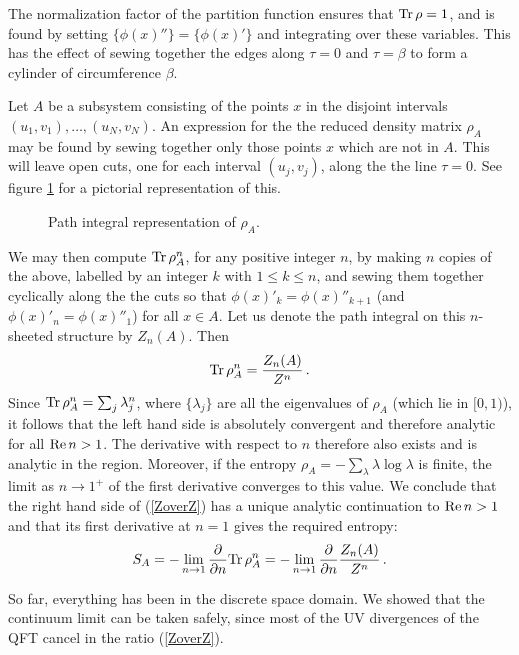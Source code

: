 \documentclass{ws-ijqi}
\begin{document}
The normalization factor of the partition function ensures that
${\rm Tr}\,\rho=1$, and is found by 
setting $\{\phi(x)''\}=\{\phi(x)'\}$ and integrating
over these variables. This has the effect of sewing together the edges
along $\tau=0$ and $\tau=\beta$ to form a cylinder of circumference
$\beta$. 


Let $A$ be a subsystem consisting of the points $x$ in the
disjoint intervals $(u_1,v_1),\ldots,(u_N,v_N)$. An expression for the
the reduced density matrix $\rho_A$
may be found %
by sewing together only those points $x$ which are not in $A$. This
will leave open cuts, one for each interval
$(u_j,v_j)$, along the the line $\tau=0$. See figure \ref{cil} for a 
pictorial representation of this.

\begin{figure}[b]
\caption{Path integral representation of $\rho_A$.}
\vspace{2mm}
\centerline{}
\label{cil}
\end{figure}

We may then compute ${\rm Tr}\,\rho_A^n$, for any positive
integer $n$, by making $n$ copies of the above, labelled by an integer
$k$ with $1\leq k\leq n$, and sewing them together cyclically along the 
the cuts so that $\phi(x)'_k=\phi(x)''_{k+1}$ (and
$\phi(x)'_n=\phi(x)''_1$) for all $x\in A$. Let us denote the
path integral on this $n$-sheeted structure by $Z_n(A)$.
Then
\begin{equation}
\label{ZoverZ}
{\rm Tr}\,\rho_A^n={Z_n(A)\over Z^n}\,.
\end{equation}
Since ${\rm Tr}\,\rho_A^n=\sum_j\lambda_j^n$,
where $\{\lambda_j\}$ are all the eigenvalues of $\rho_A$ (which lie in 
$[0,1)$), it follows that the left hand side is absolutely convergent and 
therefore analytic for all ${\rm Re}\,n>1$. 
The derivative with respect to $n$ therefore also
exists and is analytic in the region. Moreover, if the entropy
$\rho_A=-\sum_\lambda\lambda\log\lambda$ is finite, the limit as
$n\to1^+$ of the first derivative converges to this value. 
We conclude that the right hand side of (\ref{ZoverZ}) has a unique
analytic continuation to ${\rm Re}\,n>1$ and that its first derivative
at $n=1$ gives the required entropy:
\begin{equation}
S_A= -\lim_{n\to1}{\partial\over\partial n} {\rm Tr}\,\rho_A^n=
-\lim_{n\to1}{\partial\over\partial n}{Z_n(A)\over Z^n}\,.
\end{equation}

So far, everything has been in the discrete space domain. 
We showed\cite{cc-04} that the continuum limit can be taken safely, 
since most of the UV divergences of the QFT cancel in the ratio 
(\ref{ZoverZ}).
\end{document}
